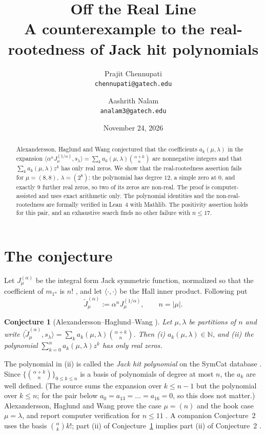 \documentclass[11pt]{article}
\title{Off the Real Line\\[0.4em]\large A counterexample to the real-rootedness of Jack hit polynomials}
\author{Prajit Chennupati\\ \small\texttt{chennupati@gatech.edu} \and Aashrith Nalam\\ \small\texttt{analam3@gatech.edu}}
\date{November 24, 2026}
\newtheorem{conjecture}[theorem]{Conjecture}
\theoremstyle{remark}
\newcommand{\Jt}{\widetilde{J}}
\begin{document}
\maketitle
\begin{abstract}
Alexandersson, Haglund and Wang conjectured that the coefficients $a_k(\mu,\lambda)$ in the expansion
$\langle \alpha^n J_\mu^{(1/\alpha)}, s_\lambda\rangle=\sum_k a_k(\mu,\lambda)\binom{\alpha+k}{n}$ are
nonnegative integers and that $\sum_k a_k(\mu,\lambda)z^k$ has only real zeros. We show that the
real-rootedness assertion fails for $\mu=(8,8)$, $\lambda=(2^8)$: the polynomial has degree $12$, a simple
zero at $0$, and exactly $9$ further real zeros, so two of its zeros are non-real. The proof is
computer-assisted and uses exact arithmetic only. The polynomial identities and the non-real-rootedness are
formally verified in Lean~4 with Mathlib. The positivity assertion holds for this pair, and an exhaustive
search finds no other failure with $n\le 17$.
\end{abstract}

\section{The conjecture}

Let $J_\mu^{(\alpha)}$ be the integral form Jack symmetric function, normalized so that the coefficient of
$m_{1^n}$ is $n!$ \cite{Mac,Sta}, and let $\langle\cdot,\cdot\rangle$ be the Hall inner product. Following
\cite{AHW18,AHW21} put
\[
  \Jt_\mu^{(\alpha)} := \alpha^{n} J_\mu^{(1/\alpha)}, \qquad n=|\mu| .
\]

\begin{conjecture}[{Alexandersson--Haglund--Wang \cite[Conj.~1]{AHW18,AHW21}}]\label{conj}
Let $\mu,\lambda$ be partitions of $n$ and write
$\langle \Jt_\mu^{(\alpha)}, s_\lambda\rangle=\sum_{k} a_k(\mu,\lambda)\binom{\alpha+k}{n}$. Then
\textup{(i)} $a_k(\mu,\lambda)\in\mathbb N$, and \textup{(ii)} the polynomial
$\sum_{k=0}^{n}a_k(\mu,\lambda)z^k$ has only real zeros.
\end{conjecture}

The polynomial in (ii) is called the \emph{Jack hit polynomial} on the SymCat database \cite{SymCat}.
Since $\{\binom{\alpha+k}{n}\}_{0\le k\le n}$ is a basis of polynomials of degree at most $n$, the $a_k$ are
well defined. (The source sums the expansion over $k\le n-1$ but the polynomial over $k\le n$; for the pair
below $a_0=a_{13}=\dots=a_{16}=0$, so this does not matter.)
Alexandersson, Haglund and Wang prove the case $\mu=(n)$ and the hook case $\mu=\lambda$, and report computer verification for
$n\le 11$ \cite{AHW18}. A companion Conjecture~2 uses the basis $\binom{\alpha}{k}k!$; part (ii) of
Conjecture~\ref{conj} implies part (ii) of Conjecture~2 \cite{AHW18}.
\end{document}
